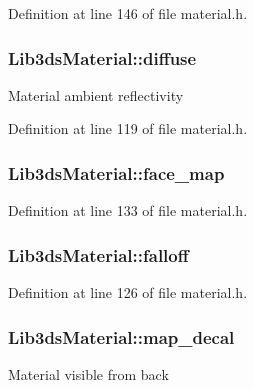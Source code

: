 Definition at line 146 of file material.\-h.

\hypertarget{struct_lib3ds_material_abefbe1a6379b99e883185c02c611d6e5}{
\subsubsection[{diffuse}]{ Lib3ds\-Material\-::diffuse}}\label{struct_lib3ds_material_abefbe1a6379b99e883185c02c611d6e5}
Material ambient reflectivity 

Definition at line 119 of file material.\-h.

\hypertarget{struct_lib3ds_material_a7b304872027093d15638aa2ca0b9f909}{
\subsubsection[{face\-\_\-map}]{ Lib3ds\-Material\-::face\-\_\-map}}\label{struct_lib3ds_material_a7b304872027093d15638aa2ca0b9f909}


Definition at line 133 of file material.\-h.

\hypertarget{struct_lib3ds_material_a6d1b0df9e5e4c5a99b7538097c132cf7}{
\subsubsection[{falloff}]{ Lib3ds\-Material\-::falloff}}\label{struct_lib3ds_material_a6d1b0df9e5e4c5a99b7538097c132cf7}


Definition at line 126 of file material.\-h.

\hypertarget{struct_lib3ds_material_a4ed5b1e7232fd7a60665bbd728a4cfc0}{
\subsubsection[{map\-\_\-decal}]{ Lib3ds\-Material\-::map\-\_\-decal}}\label{struct_lib3ds_material_a4ed5b1e7232fd7a60665bbd728a4cfc0}
Material visible from back 

